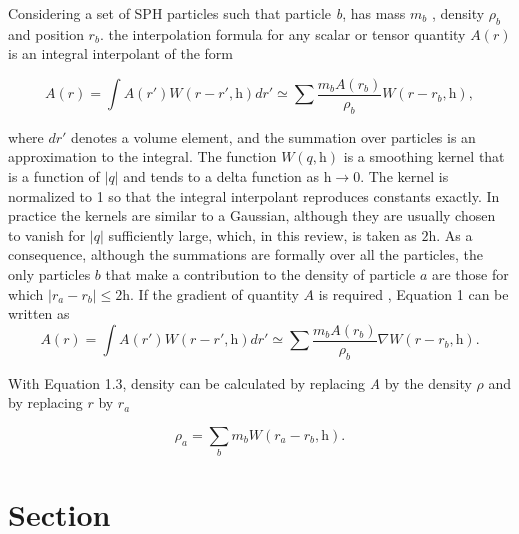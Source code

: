 Considering a set of SPH particles \cite{monaghan_smoothed_2012} such that particle \textit{b}, has mass $m_{b}$ , density $\rho_{b}$ and position $r_{b}$. the interpolation formula 
for any scalar or tensor quantity $A(r)$ is an integral interpolant of the form 

\begin{equation} 
A(r) = \int A(r')W(r-r',\textit{h})dr' \simeq \sum \frac{m_{b}A(r_{b})}{\rho_{b}}W(r-r_{b},\textit{h}),
\end{equation}

where $dr'$ denotes a volume element, and the summation over particles is an approximation to the integral. The function $W(q,\textit{h})$ is a smoothing kernel that is a function of
$|q|$ and tends to a delta function as $\textit{h}\rightarrow 0$.  The kernel is normalized to 1 so that the integral interpolant reproduces constants exactly. In practice the kernels 
are similar to a Gaussian, although they are usually chosen to vanish for $|q|$ sufficiently large, which, in this review, is taken as $2\textit{h}$. As a consequence, although the 
summations are formally over all the particles, the only particles $\textit{b}$ that make a contribution to the density of particle $\textit{a}$ are those for which 
$|r_{a}-r_{b}|\leq 2\textit{h}$. If the gradient of quantity $A$ is required , Equation 1 can be written as
\begin{equation} 
A(r) = \int A(r')W(r-r',\textit{h})dr' \simeq \sum \frac{m_{b}A(r_{b})}{\rho_{b}}\nabla W(r-r_{b},\textit{h}).
\end{equation}

With Equation 1.3, density can be calculated by replacing \textit{A} by the density $\rho$ and by replacing $r$ by $r_{a}$

\begin{equation}
\rho_{a} = \sum_{b} m_{b}W(r_{a}-r_{b},\textit{h}).
\end{equation}


\section{Section}
\label{sec:section 2}


